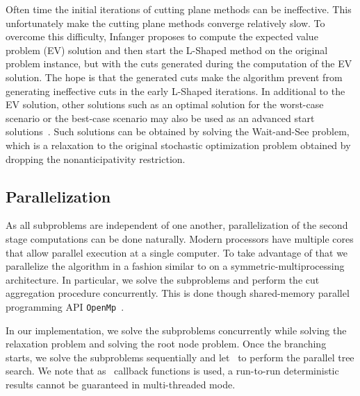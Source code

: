 Often time the initial iterations of cutting plane methods can be ineffective. This unfortunately make the cutting plane methods converge relatively slow. To overcome this difficulty, Infanger proposes to compute the expected value problem (EV) solution and then start the L-Shaped method on the original problem instance, but with the cuts generated during the computation of the EV solution. The hope is that the generated cuts make the algorithm prevent from generating ineffective cuts in the early L-Shaped iterations. In additional to the EV solution, other solutions such as an optimal solution for the worst-case scenario or the best-case scenario may also be used as an advanced start solutions~\cite{Wolf.Koberstein2013Dynamicsequencingand}. Such solutions can be obtained by solving the Wait-and-See problem, which is a relaxation to the original stochastic optimization problem obtained by dropping the nonanticipativity restriction.




\subsection{Parallelization}
\label{subsec:Parallelization}

As all subproblems are independent of one another, parallelization of the second stage computations can be done naturally. Modern processors have multiple cores that allow parallel execution at a single computer. To take advantage of that we parallelize the algorithm in a fashion similar to \cite{Ariyawansa.Hudson1991Performancebenchmarkparallel, Wolf2013Advancedaccelerationtechniques} on a symmetric-multiprocessing architecture. In particular, we solve the subproblems and perform the cut aggregation procedure concurrently. This is done though shared-memory parallel programming API {\tt OpenMp}~\cite{OpenMP(OpenMulti}.

In our implementation, we solve the subproblems concurrently while solving the relaxation problem and solving the root node problem. Once the branching starts, we solve the subproblems sequentially and let \Cplex~to perform the parallel tree search. We note that as \Cplex~callback functions is used, a run-to-run deterministic results cannot be guaranteed in multi-threaded mode.



